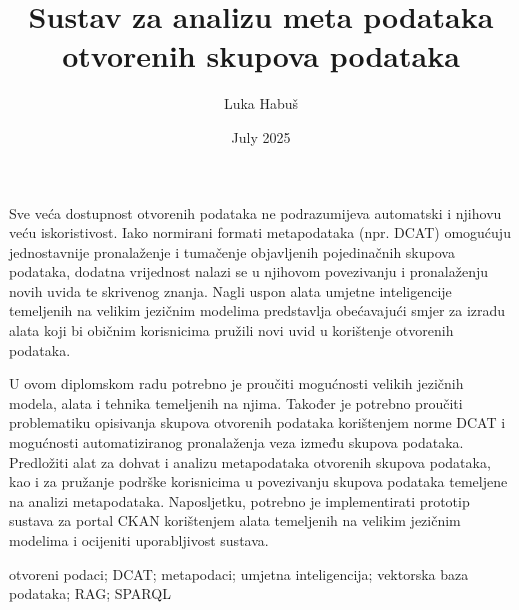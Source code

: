\documentclass[diplomskirad]{fer}
\title{Sustav za analizu meta podataka otvorenih skupova podataka}
\author{Luka Habuš}
\date{July 2025}
\begin{document}
\maketitle



\begin{zahvale}
\end{zahvale}

\mainmatter

\tableofcontents








\begin{sazetak}
Sve veća dostupnost otvorenih podataka ne podrazumijeva automatski i njihovu veću iskoristivost. Iako normirani formati metapodataka (npr. DCAT) omogućuju jednostavnije pronalaženje i tumačenje objavljenih pojedinačnih skupova podataka, dodatna vrijednost nalazi se u njihovom povezivanju i pronalaženju novih uvida te skrivenog znanja. Nagli uspon alata umjetne inteligencije temeljenih na velikim jezičnim modelima predstavlja obećavajući smjer za izradu alata koji bi običnim korisnicima pružili novi uvid u korištenje otvorenih podataka.

U ovom diplomskom radu potrebno je proučiti mogućnosti velikih jezičnih modela, alata i tehnika temeljenih na njima. Također je potrebno proučiti problematiku opisivanja skupova otvorenih podataka korištenjem norme DCAT i mogućnosti automatiziranog pronalaženja veza između skupova podataka. Predložiti alat za dohvat i analizu metapodataka otvorenih skupova podataka, kao i za pružanje podrške korisnicima u povezivanju skupova podataka temeljene na analizi metapodataka. Naposljetku, potrebno je implementirati prototip sustava za portal CKAN korištenjem alata temeljenih na velikim jezičnim modelima i ocijeniti uporabljivost sustava.
\end{sazetak}

\begin{kljucnerijeci}
    otvoreni podaci; DCAT; metapodaci; umjetna inteligencija; vektorska baza podataka; RAG; SPARQL
\end{kljucnerijeci}
\end{document}
